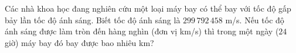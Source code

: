 \begin{ex}
Các nhà khoa học đang nghiên cứu một loại máy bay có thể bay với tốc độ gấp bảy lần tốc độ ánh sáng. Biết tốc độ ánh sáng là $299\,792\,458$ m/s. Nếu tốc độ ánh sáng được làm tròn đến hàng nghìn (đơn vị km/s) thì trong một ngày ($24$ giờ) máy bay đó bay được bao nhiêu km?
\end{ex}

